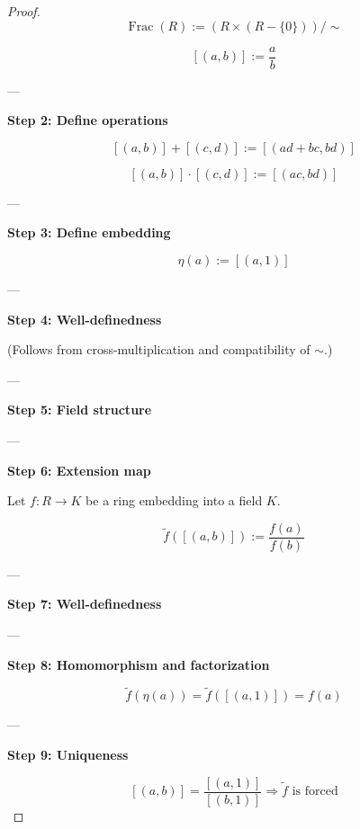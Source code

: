 \documentclass[10pt,a4paper]{book}
\begin{document}
\begin{proof}
    \[
        \operatorname{Frac}(R) := (R \times (R-\{0\}))/\sim
    \]

    \[
        [(a,b)] := \frac{a}{b}
    \]

    ---

    \textbf{Step 2: Define operations}

    \[
        [(a,b)] + [(c,d)] := [(ad + bc, bd)]
    \]

    \[
        [(a,b)] \cdot [(c,d)] := [(ac, bd)]
    \]

    ---

    \textbf{Step 3: Define embedding}

    \[
        \eta(a) := [(a,1)]
    \]

    ---

    \textbf{Step 4: Well-definedness}

    (Follows from cross-multiplication and compatibility of $\sim$.)

    ---

    \textbf{Step 5: Field structure}

    \begin{fitchproof}[arrayenv=tabular]


    \end{fitchproof}

    ---

    \textbf{Step 6: Extension map}

    Let $f : R \to K$ be a ring embedding into a field $K$.

    \[
        \tilde{f}([(a,b)]) := \frac{f(a)}{f(b)}
    \]

    ---

    \textbf{Step 7: Well-definedness}

    \begin{fitchproof}[arrayenv=tabular]


    \end{fitchproof}

    ---

    \textbf{Step 8: Homomorphism and factorization}

    \[
        \tilde{f}(\eta(a)) = \tilde{f}([(a,1)]) = f(a)
    \]

    ---

    \textbf{Step 9: Uniqueness}

    \[
        [(a,b)] = \frac{[(a,1)]}{[(b,1)]}
        \Rightarrow \tilde{f} \text{ is forced}
    \]

\end{proof}
\end{document}
